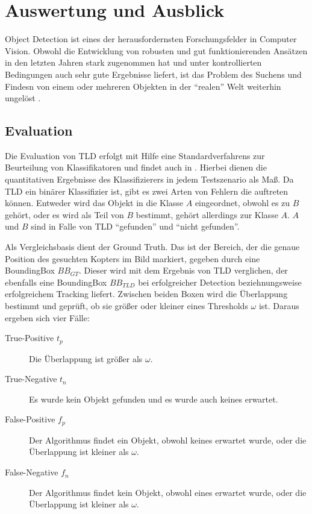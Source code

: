 \section{Auswertung und Ausblick}
	Object Detection ist eines der herausfordernsten Forschungsfelder in Computer Vision. Obwohl die Entwicklung von robusten und gut funktionierenden Ansätzen in den letzten Jahren stark zugenommen hat und unter kontrollierten Bedingungen auch sehr gute Ergebnisse liefert, ist das Problem des Suchens und Findesn von einem oder mehreren Objekten in der ``realen'' Welt weiterhin ungelöst \cite{ODS}.

\subsection{Evaluation}
	Die Evaluation von TLD erfolgt mit Hilfe eine Standardverfahrens zur Beurteilung von Klassifikatoren und findet auch in \cite{TLD}. Hierbei dienen die quantitativen Ergebnisse des Klassifizierers in jedem Testszenario als Maß. Da TLD ein binärer Klassifizier ist, gibt es zwei Arten von Fehlern die auftreten können. Entweder wird das Objekt in die Klasse $A$ eingeordnet, obwohl es zu $B$ gehört, oder es wird als Teil von $B$ bestimmt, gehört allerdings zur Klasse $A$. $A$ und $B$ sind in Falle von TLD ``gefunden'' und ``nicht gefunden''.
	
	Als Vergleichsbasis dient der Ground Truth. Das ist der Bereich, der die genaue Position des gesuchten Kopters im Bild markiert, gegeben durch eine BoundingBox $BB_{GT}$. Dieser wird mit dem Ergebnis von TLD verglichen, der ebenfalls eine BoundingBox $BB_{TLD}$ bei erfolgreicher Detection beziehnungsweise erfolgreichem Tracking liefert. Zwischen beiden Boxen wird die Überlappung bestimmt und geprüft, ob sie größer oder kleiner eines Thresholds $\omega$ ist. Daraus ergeben sich vier Fälle:

	\begin{description}
		\item [True-Positive $t_p$] Die Überlappung ist größer als $\omega$.
		\item [True-Negative $t_n$] Es wurde kein Objekt gefunden und es wurde auch keines erwartet.
		\item [False-Positive $f_p$] Der Algorithmus findet ein Objekt, obwohl keines erwartet wurde, oder die Überlappung ist kleiner als $\omega$.
		\item [False-Negative $f_n$] Der Algorithmus findet kein Objekt, obwohl eines erwartet wurde, oder die Überlappung ist kleiner als $\omega$.
	\end{description}


